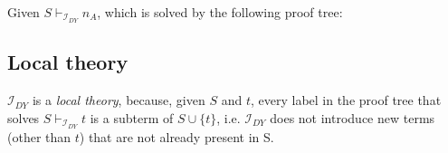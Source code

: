     \noindent
    Given $S \vdash_{\mathcal{I}_{DY}} n_A$, which is solved by the following proof tree:

    \begin{prooftree}
         
    \end{prooftree}

\subsection{Local theory}
$\mathcal{I}_{DY}$ is a \emph{local theory}, because, given $S$ and $t$, every label in the proof tree that solves $S \vdash_{\mathcal{I}_{DY}} t$ is a subterm of $S \cup \{t\}$, i.e. $\mathcal{I}_{DY}$ does not introduce new terms (other than $t$) that are not already present in S.

